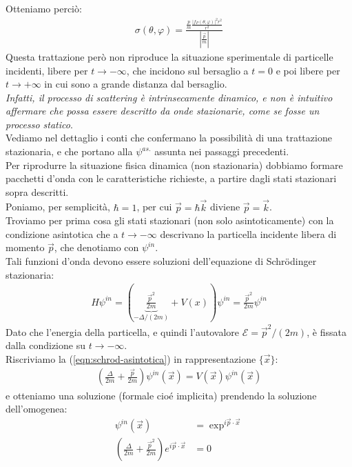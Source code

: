 \documentclass[../../FisicaTeorica.tex]{subfiles}
\begin{document}
Otteniamo perciò:
\begin{align*}
\sigma(\theta,\varphi) = \frac{\displaystyle \frac{p}{m} \frac{|f_P(\theta,\varphi)|^2 r^2}{r^2}}{\displaystyle \left| \frac{\vec{p}}{m}\right|}
\end{align*}
Questa trattazione però non riproduce la situazione sperimentale di particelle incidenti, libere per $t\to -\infty$, che incidono sul  bersaglio a $t=0$ e poi libere per $t\to +\infty$ in cui sono a grande distanza dal bersaglio.\\
\textit{Infatti, il processo di scattering è intrinsecamente dinamico, e non è intuitivo affermare che possa essere descritto da onde stazionarie, come se fosse un processo statico}.\\
Vediamo nel dettaglio i conti che confermano la possibilità di una trattazione stazionaria, e che portano alla $\psi^{as.}$ assunta nei passaggi precedenti.\\
Per riprodurre la situazione fisica dinamica (non stazionaria) dobbiamo formare pacchetti d'onda con le caratteristiche richieste, a partire dagli stati stazionari sopra descritti.\\
Poniamo, per semplicità, $\hbar = 1$, per cui $\vec{p}=\hbar \vec{k}$ diviene $\vec{p}=\vec{k}$.\\
Troviamo per prima cosa gli stati stazionari (non solo asintoticamente) con la condizione asintotica che a $t\to -\infty$ descrivano la particella incidente libera di momento $\vec{p}$, che denotiamo con $\psi^{in}$.\\
Tali funzioni d'onda devono essere soluzioni dell'equazione di Schr\"odinger stazionaria:
\begin{align}
H\psi^{in} = \left(\underbrace{\frac{\vec{p}^2}{2m} }_{-\Delta/(2m)}+ V(x)\right)\psi^{in} = \frac{\vec{p}^2}{2m}\psi^{in}
\label{eqn:schrod-asintotica}
\end{align}
Dato che l'energia della particella, e quindi l'autovalore $\mathcal{E} = \vec{p}^2/(2m)$, è fissata dalla condizione su $t\to -\infty$.\\
Riscriviamo la (\ref{eqn:schrod-asintotica}) in rappresentazione $\{\vec{x}\}$:
\begin{align*}
\left(\frac{\Delta}{2m} + \frac{\vec{p}}{2m}\right)\psi^{in}(\vec{x}) = V(\vec{x})\psi^{in}(\vec{x})
\end{align*}
e otteniamo una soluzione (formale cioé implicita) prendendo la soluzione dell'omogenea:
\begin{align*}
\psi^{in}(\vec{x}) &= \exp^{i\vec{p}\cdot \vec{x}}\\
\left(\frac{\Delta}{2m} + \frac{\vec{p}^2}{2m}\right) e^{i\vec{p}\cdot \vec{x}} &=0
\end{align*}
\end{document}

